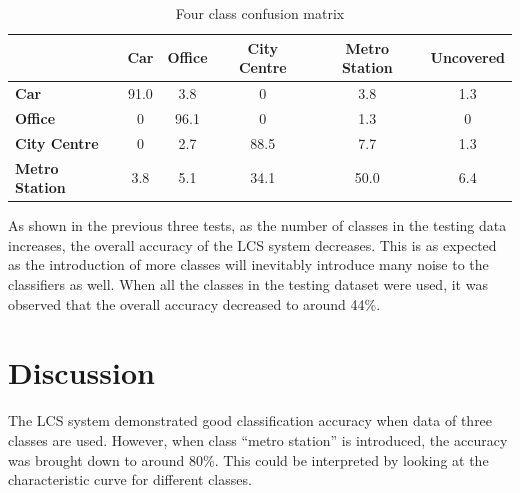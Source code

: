 \documentclass[11pt]{article}
\begin{document}
\begin{table}[!htbp]
	\centering
	\caption{Four class confusion matrix}
	\label{tab:conf4}
	\begin{tabularx}{0.9\textwidth}{lccccc}
		\toprule
		                       & \textbf{Car} & \textbf{Office} & \textbf{City Centre} & \textbf{Metro Station} & \textbf{Uncovered} \\ \midrule
		\textbf{Car}           &     91.0     &       3.8       &          0           & 3.8                    &        1.3         \\
		\textbf{Office}        &      0       &      96.1       &          0           & 1.3                    &         0          \\
		\textbf{City Centre}   &      0       &       2.7       &         88.5         & 7.7                    &        1.3         \\ \bottomrule
		\textbf{Metro Station} &     3.8      &       5.1       &         34.1         & 50.0                   &        6.4 \\ \bottomrule
	\end{tabularx}
\end{table}




As shown in the previous three tests, as the number of classes in the testing data increases, the overall accuracy of the LCS system decreases. This is as expected as the introduction of more classes will inevitably introduce many noise to the classifiers as well.  When all the classes in the testing dataset were used, it was observed that the overall accuracy decreased to around 44\%.




\section{Discussion}

The LCS system demonstrated good classification accuracy when data of three classes are used. However, when class ``metro station'' is introduced, the accuracy was brought down to around 80\%. This could be interpreted by looking at the characteristic curve for different classes.
\end{document}
